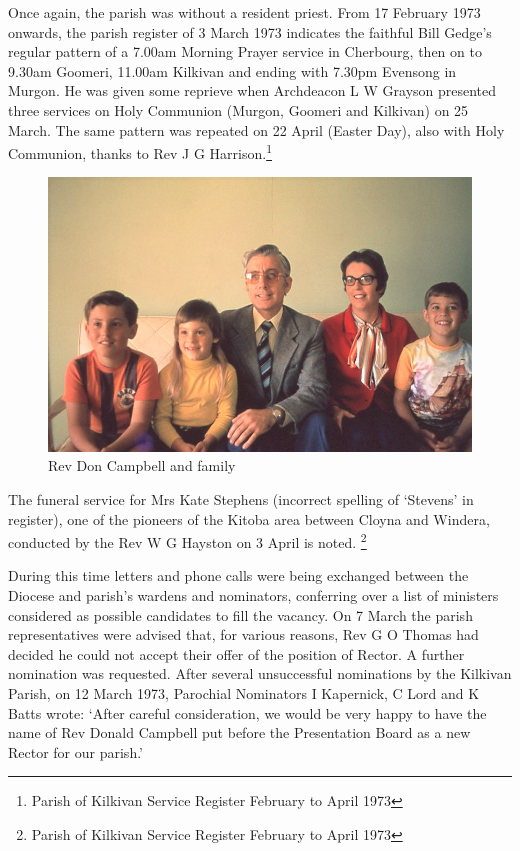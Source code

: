Once again, the parish was without a resident priest. From 17 February
1973 onwards, the parish register of 3 March 1973 indicates the faithful
Bill Gedge's regular pattern of a 7.00am Morning Prayer service in
Cherbourg, then on to 9.30am Goomeri, 11.00am Kilkivan and ending with
7.30pm Evensong in Murgon. He was given some reprieve when Archdeacon L
W Grayson presented three services on Holy Communion (Murgon, Goomeri
and Kilkivan) on 25 March. The same pattern was repeated on 22 April
(Easter Day), also with Holy Communion, thanks to Rev J G
Harrison.\footnote{Parish of Kilkivan Service Register February to April
  1973}




\begin{figure}[!h]
\begin{center}
\includegraphics[width=1.\textwidth,center]{images/DonCambellAndFamily.jpg}
\caption{Rev Don Campbell and family}
\end{center}
\end{figure}


The funeral service for Mrs Kate Stephens (incorrect spelling of
`Stevens' in register), one of the pioneers of the Kitoba area between
Cloyna and Windera, conducted by the Rev W G Hayston on 3 April is
noted. \footnote{Parish of Kilkivan Service Register February to April
  1973}

During this time letters and phone calls were being exchanged between
the Diocese and parish's wardens and nominators, conferring over a list
of ministers considered as possible candidates to fill the vacancy. On 7
March the parish representatives were advised that, for various reasons,
Rev G O Thomas had decided he could not accept their offer of the
position of Rector. A further nomination was requested. After several
unsuccessful nominations by the Kilkivan Parish, on 12 March 1973,
Parochial Nominators I Kapernick, C Lord and K Batts wrote: `After
careful consideration, we would be very happy to have the name of Rev
Donald Campbell put before the Presentation Board as a new Rector for
our parish.'

